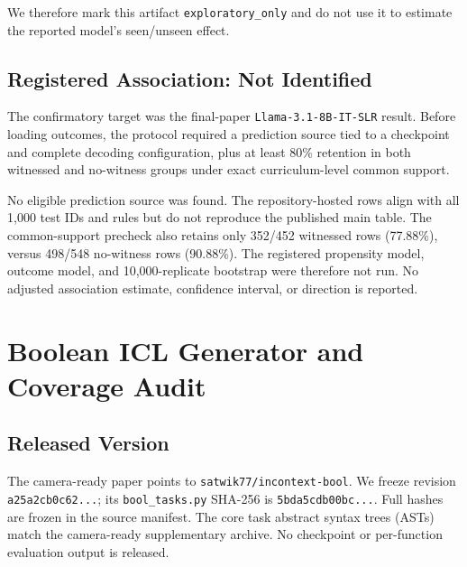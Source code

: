 We therefore mark this artifact \texttt{exploratory\_only} and do not use it
to estimate the reported model's seen/unseen effect.

\subsection{Registered Association: Not Identified}

The confirmatory target was the final-paper
\texttt{Llama-3.1-8B-IT-SLR} result.  Before loading outcomes, the protocol
required a prediction source tied to a checkpoint and complete decoding
configuration, plus at least 80\% retention in both witnessed and no-witness
groups under exact curriculum-level common support.

No eligible prediction source was found.  The repository-hosted rows align
with all 1,000 test IDs and rules but do not reproduce the published main
table.  The common-support precheck also retains only 352/452 witnessed rows
(77.88\%), versus 498/548 no-witness rows (90.88\%).  The registered
propensity model, outcome model, and 10,000-replicate bootstrap were therefore
not run.  No adjusted association estimate, confidence interval, or direction
is reported.

\section{Boolean ICL Generator and Coverage Audit}

\subsection{Released Version}

The camera-ready paper \cite{bhattamishra2024understanding} points to
\texttt{satwik77/incontext-bool}.  We freeze revision
\texttt{a25a2cb0c62...}; its
\texttt{bool\_tasks.py} SHA-256 is
\texttt{5bda5cdb00bc...}.  Full hashes are frozen in the source manifest.
The core task abstract syntax trees (ASTs) match the camera-ready supplementary
archive.  No checkpoint or per-function evaluation output is released.

